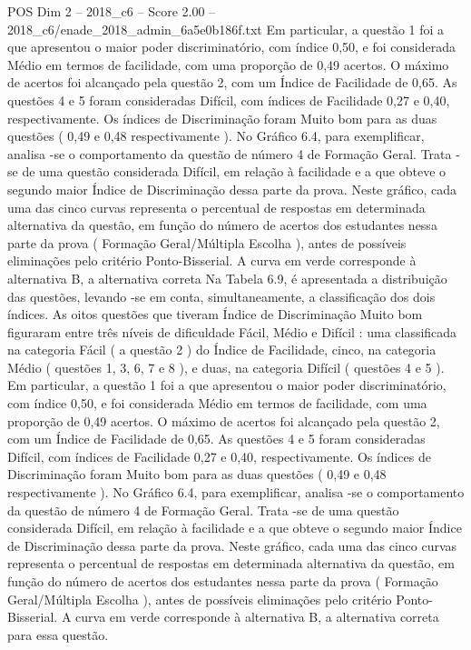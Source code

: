\begin{textsample}{POS Dim 2 – 2018\_c6 – Score 2.00 – 2018\_c6/enade\_2018\_admin\_6a5e0b186f.txt}
Em particular, a questão 1 foi a que apresentou o maior poder discriminatório, com índice 0,50, e foi considerada Médio em termos de facilidade, com uma proporção de 0,49 acertos.
O máximo de acertos foi alcançado pela questão 2, com um Índice de Facilidade de 0,65.
As questões 4 e 5 foram consideradas Difícil, com índices de Facilidade 0,27 e 0,40, respectivamente.
Os índices de Discriminação foram Muito bom para as duas questões ( 0,49 e 0,48 respectivamente ).
No Gráfico 6.4, para exemplificar, analisa -se o comportamento da questão de número 4 de Formação Geral.
Trata -se de uma questão considerada Difícil, em relação à facilidade e a que obteve o segundo maior Índice de Discriminação dessa parte da prova.
Neste gráfico, cada uma das cinco curvas representa o percentual de respostas em determinada alternativa da questão, em função do número de acertos dos estudantes nessa parte da prova ( Formação Geral/Múltipla Escolha ), antes de possíveis eliminações pelo critério Ponto-Bisserial.
A curva em verde corresponde à alternativa B, a alternativa correta Na Tabela 6.9, é apresentada a distribuição das questões, levando -se em conta, simultaneamente, a classificação dos dois índices.
As oitos questões que tiveram Índice de Discriminação Muito bom figuraram entre três níveis de dificuldade Fácil, Médio e Difícil : uma classificada na categoria Fácil ( a questão 2 ) do Índice de Facilidade, cinco, na categoria Médio ( questões 1, 3, 6, 7 e 8 ), e duas, na categoria Difícil ( questões 4 e 5 ).
Em particular, a questão 1 foi a que apresentou o maior poder discriminatório, com índice 0,50, e foi considerada Médio em termos de facilidade, com uma proporção de 0,49 acertos.
O máximo de acertos foi alcançado pela questão 2, com um Índice de Facilidade de 0,65.
As questões 4 e 5 foram consideradas Difícil, com índices de Facilidade 0,27 e 0,40, respectivamente.
Os índices de Discriminação foram Muito bom para as duas questões ( 0,49 e 0,48 respectivamente ).
No Gráfico 6.4, para exemplificar, analisa -se o comportamento da questão de número 4 de Formação Geral.
Trata -se de uma questão considerada Difícil, em relação à facilidade e a que obteve o segundo maior Índice de Discriminação dessa parte da prova.
Neste gráfico, cada uma das cinco curvas representa o percentual de respostas em determinada alternativa da questão, em função do número de acertos dos estudantes nessa parte da prova ( Formação Geral/Múltipla Escolha ), antes de possíveis eliminações pelo critério Ponto-Bisserial.
A curva em verde corresponde à alternativa B, a alternativa correta para essa questão.

\end{textsample}
